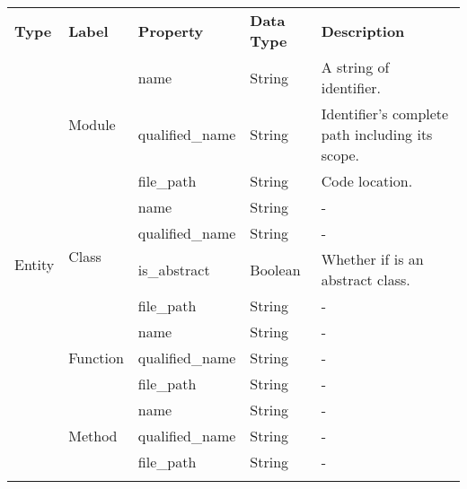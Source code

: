 \begin{tabular}{p{1.6cm}p{1.7cm}p{2cm}p{3.3cm}p{7.5cm}}
\hline
\textbf{Type} & \textbf{Label} & \textbf{Property} & \textbf{Data Type} & \textbf{Description} \\
\cline{1-1}\cline{2-2}\cline{3-3}\cline{4-4}\cline{5-5}
\multirow{13}{*}{Entity} & \multirow{3}{*}{Module} & name & String & A string of identifier. \\
\cline{3-3}\cline{4-4}\cline{5-5}
 &  & qualified\_name & String & Identifier's complete path including its scope. \\
\cline{3-3}\cline{4-4}\cline{5-5}
 &  & file\_path & String & Code location. \\
\cline{2-2}\cline{3-3}\cline{4-4}\cline{5-5}
 & \multirow{4}{*}{Class} & name & String & - \\
\cline{3-3}\cline{4-4}\cline{5-5}
 &  & qualified\_name & String & - \\
\cline{3-3}\cline{4-4}\cline{5-5}
 &  & is\_abstract & Boolean & Whether if is an abstract class. \\
\cline{3-3}\cline{4-4}\cline{5-5}
 &  & file\_path & String & - \\
\cline{2-2}\cline{3-3}\cline{4-4}\cline{5-5}
 & \multirow{3}{*}{Function} & name & String & - \\
\cline{3-3}\cline{4-4}\cline{5-5}
 &  & qualified\_name & String & - \\
\cline{3-3}\cline{4-4}\cline{5-5}
 &  & file\_path & String & - \\
\cline{2-2}\cline{3-3}\cline{4-4}\cline{5-5}
 & \multirow{3}{*}{Method} & name & String & - \\
\cline{3-3}\cline{4-4}\cline{5-5}
 &  & qualified\_name & String & - \\
\cline{3-3}\cline{4-4}\cline{5-5}
 &  & file\_path & String & - \\
\cline{1-1}\cline{2-2}\cline{3-3}\cline{4-4}\cline{5-5}
 &  &  &  &  \\
\cline{1-1}\cline{2-2}\cline{3-3}\cline{4-4}\cline{5-5}
\hline
\end{tabular}

